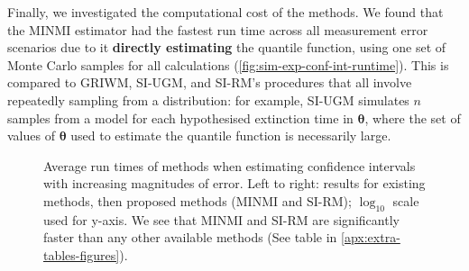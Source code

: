 Finally, we investigated the computational cost of the methods. We found that the MINMI estimator had the fastest run time across all measurement error scenarios due to it \textbf{directly estimating} the quantile function, using one set of Monte Carlo samples for all calculations (\autoref{fig:sim-exp-conf-int-runtime}). This is compared to GRIWM, SI-UGM, and SI-RM's procedures that all involve repeatedly sampling from a distribution: for example, SI-UGM simulates $n$ samples from a model for each hypothesised extinction time in $\bm{\theta}$, where the set of values of $\bm{\theta}$ used to estimate the quantile function is necessarily large.
\begin{figure}[ht]
    \centering
    
    \caption{Average run times of methods when estimating confidence intervals with increasing magnitudes of error. Left to right: results for existing methods, then proposed methods (MINMI and SI-RM); $\log_{10}$ scale used for y-axis. We see that MINMI and SI-RM are significantly faster than any other available methods (See table in \autoref{apx:extra-tables-figures}).}
    \label{fig:sim-exp-conf-int-runtime}
\end{figure}